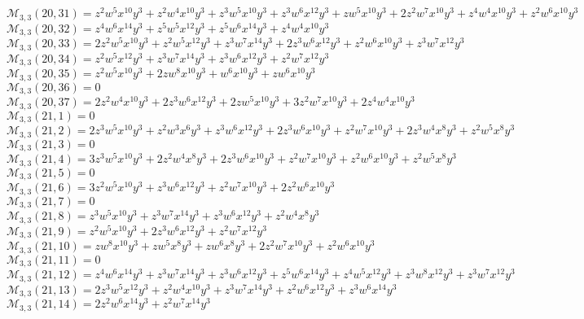 $\mathcal{M}_{3,3}(20,31)=z^2w^5x^{10}y^3+z^2w^4x^{10}y^3+z^3w^5x^{10}y^3+z^3w^6x^{12}y^3+zw^5x^{10}y^3+2z^2w^7x^{10}y^3+z^4w^4x^{10}y^3+z^2w^6x^{10}y^3$\\
$\mathcal{M}_{3,3}(20,32)=z^4w^6x^{14}y^3+z^5w^5x^{12}y^3+z^5w^6x^{14}y^3+z^4w^4x^{10}y^3$\\
$\mathcal{M}_{3,3}(20,33)=2z^2w^5x^{10}y^3+z^2w^5x^{12}y^3+z^3w^7x^{14}y^3+2z^3w^6x^{12}y^3+z^2w^6x^{10}y^3+z^3w^7x^{12}y^3$\\
$\mathcal{M}_{3,3}(20,34)=z^2w^5x^{12}y^3+z^3w^7x^{14}y^3+z^3w^6x^{12}y^3+z^2w^7x^{12}y^3$\\
$\mathcal{M}_{3,3}(20,35)=z^2w^5x^{10}y^3+2zw^8x^{10}y^3+w^6x^{10}y^3+zw^6x^{10}y^3$\\
$\mathcal{M}_{3,3}(20,36)=0$\\
$\mathcal{M}_{3,3}(20,37)=2z^2w^4x^{10}y^3+2z^3w^6x^{12}y^3+2zw^5x^{10}y^3+3z^2w^7x^{10}y^3+2z^4w^4x^{10}y^3$\\
$\mathcal{M}_{3,3}(21,1)=0$\\
$\mathcal{M}_{3,3}(21,2)=2z^3w^5x^{10}y^3+z^2w^3x^6y^3+z^3w^6x^{12}y^3+2z^3w^6x^{10}y^3+z^2w^7x^{10}y^3+2z^3w^4x^8y^3+z^2w^5x^8y^3$\\
$\mathcal{M}_{3,3}(21,3)=0$\\
$\mathcal{M}_{3,3}(21,4)=3z^3w^5x^{10}y^3+2z^2w^4x^8y^3+2z^3w^6x^{10}y^3+z^2w^7x^{10}y^3+z^2w^6x^{10}y^3+z^2w^5x^8y^3$\\
$\mathcal{M}_{3,3}(21,5)=0$\\
$\mathcal{M}_{3,3}(21,6)=3z^2w^5x^{10}y^3+z^3w^6x^{12}y^3+z^2w^7x^{10}y^3+2z^2w^6x^{10}y^3$\\
$\mathcal{M}_{3,3}(21,7)=0$\\
$\mathcal{M}_{3,3}(21,8)=z^3w^5x^{10}y^3+z^3w^7x^{14}y^3+z^3w^6x^{12}y^3+z^2w^4x^8y^3$\\
$\mathcal{M}_{3,3}(21,9)=z^2w^5x^{10}y^3+2z^3w^6x^{12}y^3+z^2w^7x^{12}y^3$\\
$\mathcal{M}_{3,3}(21,10)=zw^8x^{10}y^3+zw^5x^8y^3+zw^6x^8y^3+2z^2w^7x^{10}y^3+z^2w^6x^{10}y^3$\\
$\mathcal{M}_{3,3}(21,11)=0$\\
$\mathcal{M}_{3,3}(21,12)=z^4w^6x^{14}y^3+z^3w^7x^{14}y^3+z^3w^6x^{12}y^3+z^5w^6x^{14}y^3+z^4w^5x^{12}y^3+z^3w^8x^{12}y^3+z^3w^7x^{12}y^3$\\
$\mathcal{M}_{3,3}(21,13)=2z^3w^5x^{12}y^3+z^2w^4x^{10}y^3+z^3w^7x^{14}y^3+z^2w^6x^{12}y^3+z^3w^6x^{14}y^3$\\
$\mathcal{M}_{3,3}(21,14)=2z^2w^6x^{14}y^3+z^2w^7x^{14}y^3$\\
